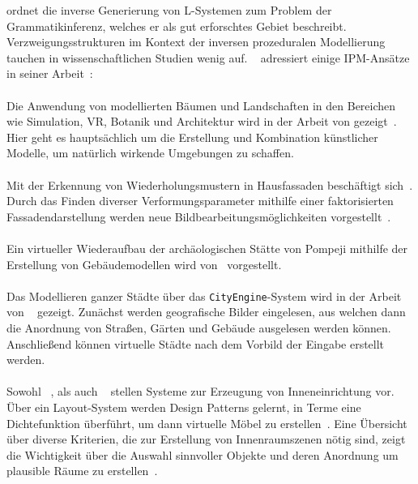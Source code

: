\citeauthor{higuera_2010} ordnet die inverse Generierung von L-Systemen zum Problem der Grammatikinferenz, welches er
als gut erforschtes Gebiet beschreibt.
Verzweigungsstrukturen im Kontext der inversen prozeduralen Modellierung tauchen in wissenschaftlichen Studien wenig auf.
~\citeauthor{guo_2020} adressiert einige IPM-Ansätze in seiner Arbeit~\cite{guo_2020}:\\~\\
Die Anwendung von modellierten Bäumen und Landschaften in den Bereichen wie Simulation, VR, Botanik und Architektur
wird in der Arbeit von \citeauthor{deussen_2010} gezeigt~\cite{deussen_2010}.
Hier geht es hauptsächlich um die Erstellung und Kombination künstlicher Modelle, um natürlich wirkende Umgebungen zu
schaffen.\\~\\
Mit der Erkennung von Wiederholungsmustern in Hausfassaden beschäftigt sich~\citeauthor{alhalawani_2013}.
Durch das Finden diverser Verformungsparameter mithilfe einer faktorisierten Fassadendarstellung werden neue
Bildbearbeitungsmöglichkeiten  vorgestellt~\cite{alhalawani_2013}.\\~\\
Ein virtueller Wiederaufbau der archäologischen Stätte von Pompeji mithilfe der Erstellung von Gebäudemodellen wird
von~\citeauthor{mueller_2006} vorgestellt.\\~\\
Das Modellieren ganzer Städte über das \texttt{CityEngine}-System wird in der Arbeit von ~\citeauthor{parish_2001}
gezeigt.
Zunächst werden geografische Bilder eingelesen, aus welchen dann die Anordnung von Straßen, Gärten und Gebäude
ausgelesen werden können.
Anschließend können virtuelle Städte nach dem Vorbild der Eingabe erstellt werden.\\~\\
Sowohl ~\citeauthor{merrell_2011}, als auch ~\citeauthor{zhang_2019} stellen Systeme zur Erzeugung von Inneneinrichtung
vor.
Über ein Layout-System werden Design Patterns gelernt, in Terme eine Dichtefunktion überführt, um dann virtuelle
Möbel zu erstellen~\cite{merrell_2011}.
Eine Übersicht über diverse Kriterien, die zur Erstellung von Innenraumszenen nötig sind, zeigt die
Wichtigkeit über die Auswahl sinnvoller Objekte und deren Anordnung um plausible Räume zu erstellen~\cite{zhang_2019}.

\newpage

